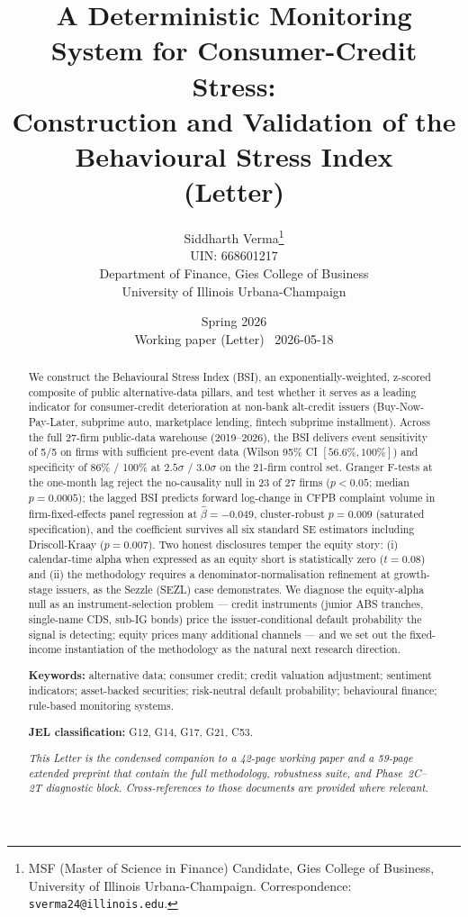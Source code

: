 \documentclass[11pt,a4paper]{article}
\title{
  \vspace{-1.5cm}
  \LARGE\textbf{A Deterministic Monitoring System for Consumer-Credit Stress:} \\
  \vspace{0.15cm}
  \large\textbf{Construction and Validation of the Behavioural Stress Index \\ (Letter)}
}
\author{
  Siddharth Verma\thanks{MSF (Master of Science in Finance) Candidate, Gies College of Business, University of Illinois Urbana-Champaign. Correspondence: \texttt{sverma24@illinois.edu}.} \\
  \small UIN: 668601217 \\
  \small Department of Finance, Gies College of Business \\
  \small University of Illinois Urbana-Champaign
}
\date{
  Spring 2026 \\
  \small Working paper (Letter) \textbar\ 2026-05-18
}
\begin{document}
\maketitle
\thispagestyle{empty}

\begin{abstract}
\noindent
We construct the Behavioural Stress Index (BSI), an exponentially-weighted, z-scored composite of public alternative-data pillars, and test whether it serves as a leading indicator for consumer-credit deterioration at non-bank alt-credit issuers (Buy-Now-Pay-Later, subprime auto, marketplace lending, fintech subprime installment). Across the full 27-firm public-data warehouse (2019--2026), the BSI delivers event sensitivity of 5/5 on firms with sufficient pre-event data (Wilson 95\% CI $[56.6\%, 100\%]$) and specificity of 86\% / 100\% at $2.5\sigma$ / $3.0\sigma$ on the 21-firm control set. Granger F-tests at the one-month lag reject the no-causality null in 23 of 27 firms ($p < 0.05$; median $p = 0.0005$); the lagged BSI predicts forward log-change in CFPB complaint volume in firm-fixed-effects panel regression at $\hat{\beta} = -0.049$, cluster-robust $p = 0.009$ (saturated specification), and the coefficient survives all six standard SE estimators including Driscoll-Kraay ($p = 0.007$). Two honest disclosures temper the equity story: (i) calendar-time alpha when expressed as an equity short is statistically zero ($t = 0.08$) and (ii) the methodology requires a denominator-normalisation refinement at growth-stage issuers, as the Sezzle (SEZL) case demonstrates. We diagnose the equity-alpha null as an instrument-selection problem --- credit instruments (junior ABS tranches, single-name CDS, sub-IG bonds) price the issuer-conditional default probability the signal is detecting; equity prices many additional channels --- and we set out the fixed-income instantiation of the methodology as the natural next research direction.

\medskip
\noindent\textbf{Keywords:} alternative data; consumer credit; credit valuation adjustment; sentiment indicators; asset-backed securities; risk-neutral default probability; behavioural finance; rule-based monitoring systems.

\medskip
\noindent\textbf{JEL classification:} G12, G14, G17, G21, C53.

\medskip
\noindent\textit{This Letter is the condensed companion to a 42-page working paper and a 59-page extended preprint that contain the full methodology, robustness suite, and Phase~2C--2T diagnostic block. Cross-references to those documents are provided where relevant.}
\end{abstract}
\end{document}

